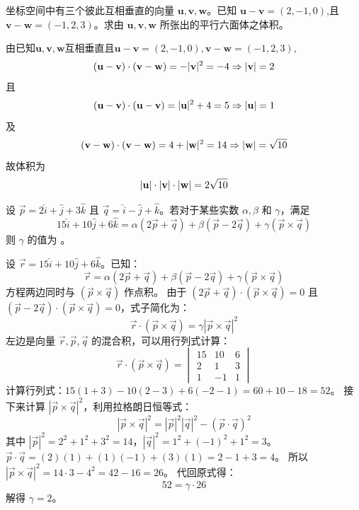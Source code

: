 \begin{questions}
    \question 坐标空间中有三个彼此互相垂直的向量 $\textbf{u}, \textbf{v}, \textbf{w}$。已知 $\textbf{u} - \textbf{v} = (2, -1, 0)$,且 $\textbf{v} - \textbf{w} = (-1, 2, 3)$。求由 $\textbf{u}, \textbf{v}, \textbf{w}$ 所张出的平行六面体之体积。
    \begin{solution}
        由已知$\textbf{u}, \textbf{v}, \textbf{w}$互相垂直且$\textbf{u} - \textbf{v} = (2, -1, 0),\textbf{v} - \textbf{w} = (-1, 2, 3)$,
        \[
        (\textbf u - \textbf v) \cdot (\textbf v - \textbf w)
        = -|\textbf v|^2= -4 \Rightarrow |\textbf v| = 2
        \]
        且
        \[
        (\textbf u - \textbf v) \cdot (\textbf u - \textbf v)
        = |\textbf u|^2 + 4 = 5
        \Rightarrow |\textbf u| = 1
        \]
        及
        \[
        (\textbf v - \textbf w) \cdot (\textbf v - \textbf w)
        = 4 + |\textbf w|^2
        = 14
        \Rightarrow |\textbf w| = \sqrt{10}
        \]
        故体积为
        \[
        |\textbf u|\cdot|\textbf v|\cdot|\textbf w| = 2\sqrt{10}
        \]
    \end{solution}

    \question 设 $\vec{p} = 2\hat{i} + \hat{j} + 3\hat{k}$ 且 $\vec{q} = \hat{i} - \hat{j} + \hat{k}$。若对于某些实数 $\alpha, \beta$ 和 $\gamma$，满足
\[
15\hat{i} + 10\hat{j} + 6\hat{k} = \alpha(2\vec{p} + \vec{q}) + \beta(\vec{p} - 2\vec{q}) + \gamma(\vec{p} \times \vec{q})
\]
则 $\gamma$ 的值为 \underline{\hspace{2cm}}。

\begin{solution}
设 $\vec{r} = 15\hat{i} + 10\hat{j} + 6\hat{k}$。已知：
\[
\vec{r} = \alpha(2\vec{p} + \vec{q}) + \beta(\vec{p} - 2\vec{q}) + \gamma(\vec{p} \times \vec{q})
\]
方程两边同时与 $(\vec{p} \times \vec{q})$ 作点积。
由于 $(2\vec{p} + \vec{q}) \cdot (\vec{p} \times \vec{q}) = 0$ 且 $(\vec{p} - 2\vec{q}) \cdot (\vec{p} \times \vec{q}) = 0$，式子简化为：
\[
\vec{r} \cdot (\vec{p} \times \vec{q}) = \gamma |\vec{p} \times \vec{q}|^2
\]
左边是向量 $\vec{r}, \vec{p}, \vec{q}$ 的混合积，可以用行列式计算：
\[
\vec{r} \cdot (\vec{p} \times \vec{q}) = 
\begin{vmatrix} 
15 & 10 & 6 \\ 
2 & 1 & 3 \\ 
1 & -1 & 1 
\end{vmatrix}
\]
计算行列式：$15(1+3) - 10(2-3) + 6(-2-1) = 60 + 10 - 18 = 52$。
接下来计算 $|\vec{p} \times \vec{q}|^2$，利用拉格朗日恒等式：
\[
|\vec{p} \times \vec{q}|^2 = |\vec{p}|^2 |\vec{q}|^2 - (\vec{p} \cdot \vec{q})^2
\]
其中 $|\vec{p}|^2 = 2^2 + 1^2 + 3^2 = 14$，$|\vec{q}|^2 = 1^2 + (-1)^2 + 1^2 = 3$。
$\vec{p} \cdot \vec{q} = (2)(1) + (1)(-1) + (3)(1) = 2 - 1 + 3 = 4$。
所以 $|\vec{p} \times \vec{q}|^2 = 14 \cdot 3 - 4^2 = 42 - 16 = 26$。
代回原式得：
\[
52 = \gamma \cdot 26
\]
解得 $\gamma = 2$。
\end{solution}
    

\end{questions}
